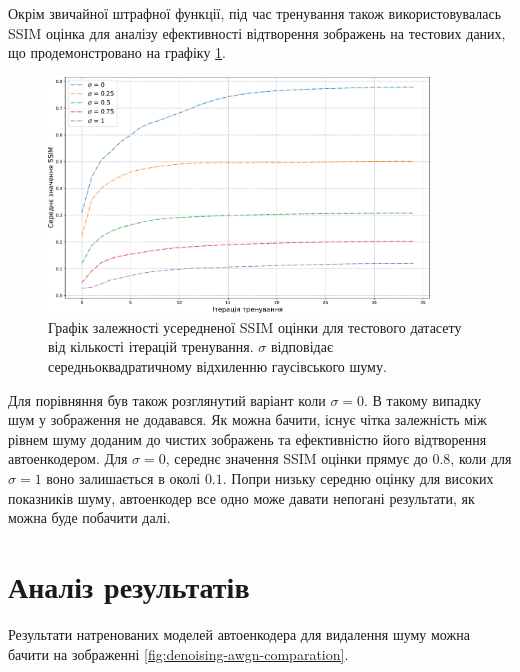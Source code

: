 \documentclass[14pt,a4paper]{extarticle}
\newcounter{e}
\numberwithin{equation}{section}
\numberwithin{figure}{section}
\begin{document}
	Окрім звичайної штрафної функції, під час тренування також використовувалась SSIM оцінка для аналізу ефективності відтворення зображень на тестових даних, що продемонстровано на графіку \ref{fig:awgn-train-ssim-comparation}.
	
	\begin{figure}[H]
		\centering
		\includegraphics[width=0.9\textwidth]{../resources/awgn-train-ssim-comparation.pdf}
		\caption{Графік залежності усередненої SSIM оцінки для тестового датасету від кількості ітерацій тренування. $\sigma$ відповідає середньоквадратичному відхиленню гаусівського шуму.}
		\label{fig:awgn-train-ssim-comparation}
	\end{figure}
	
	Для порівняння був також розглянутий варіант коли $\sigma = 0$. В такому випадку шум у зображення не додавався. Як можна бачити, існує чітка залежність між рівнем шуму доданим до чистих зображень та ефективністю його відтворення автоенкодером. Для $\sigma = 0$, середнє значення SSIM оцінки прямує до 0.8, коли для $\sigma = 1$ воно залишається в околі $0.1$. Попри низьку середню оцінку для високих показників шуму, автоенкодер все одно може давати непогані результати, як можна буде побачити далі.
		
	\newpage
	\thispagestyle{empty}
	\section{Аналіз результатів}
	
	Результати натренованих моделей автоенкодера для видалення шуму можна бачити на зображенні \ref{fig:denoising-awgn-comparation}.
	
\end{document}
